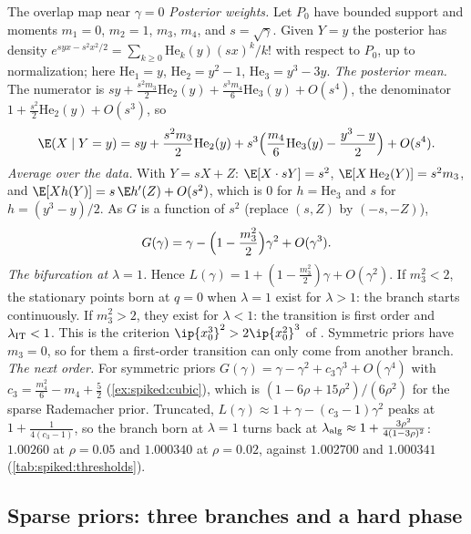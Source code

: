 \begin{refsection}
\begin{computation}{The overlap map near $\gamma=0$}\label{comp:spiked:expansion}
\step \emph{Posterior weights.} Let $P_0$ have bounded support and moments $m_1=0$, $m_2=1$, $m_3$, $m_4$, and $s=\sqrt\gamma$. Given $Y=y$ the posterior has density $e^{syx-s^2x^2/2}=\sum_{k\ge0}\mathrm{He}_k(y)(sx)^k/k!$ with respect to $P_0$, up to normalization; here $\mathrm{He}_1=y$, $\mathrm{He}_2=y^2-1$, $\mathrm{He}_3=y^3-3y$.
\step \emph{The posterior mean.} The numerator is $sy+\frac{s^2m_3}2\mathrm{He}_2(y)+\frac{s^3m_4}6\mathrm{He}_3(y)+O(s^4)$, the denominator $1+\frac{s^2}2\mathrm{He}_2(y)+O(s^3)$, so
\[
\E(X\mid Y=y)=sy+\frac{s^2m_3}2\mathrm{He}_2(y)+s^3\Bigl(\frac{m_4}6\mathrm{He}_3(y)-\frac{y^3-y}2\Bigr)+O(s^4).
\]
\step \emph{Average over the data.} With $Y=sX+Z$: $\E[X\cdot sY]=s^2$, $\E[X\,\mathrm{He}_2(Y)]=s^2m_3$, and $\E[Xh(Y)]=s\,\E h'(Z)+O(s^2)$, which is $0$ for $h=\mathrm{He}_3$ and $s$ for $h=(y^3-y)/2$. As $G$ is a function of $s^2$ (replace $(s,Z)$ by $(-s,-Z)$),
\[
G(\gamma)=\gamma-\Bigl(1-\frac{m_3^2}2\Bigr)\gamma^2+O(\gamma^3).
\]
\step \emph{The bifurcation at $\lambda=1$.} Hence $L(\gamma)=1+(1-\frac{m_3^2}2)\gamma+O(\gamma^2)$. If $m_3^2<2$, the stationary points born at $q=0$ when $\lambda=1$ exist for $\lambda>1$: the branch starts continuously. If $m_3^2>2$, they exist for $\lambda<1$: the transition is first order and $\lambda_{\mathrm{IT}}<1$. This is the criterion $\ip{x_0^3}^2>2\ip{x_0^2}^3$ of \textcite{LesieurKrzakalaZdeborova2017}. Symmetric priors have $m_3=0$, so for them a first-order transition can only come from another branch.
\step \emph{The next order.} For symmetric priors $G(\gamma)=\gamma-\gamma^2+c_3\gamma^3+O(\gamma^4)$ with $c_3=\frac{m_4^2}6-m_4+\frac52$ (\cref{ex:spiked:cubic}), which is $(1-6\rho+15\rho^2)/(6\rho^2)$ for the sparse Rademacher prior. Truncated, $L(\gamma)\approx1+\gamma-(c_3-1)\gamma^2$ peaks at $1+\frac1{4(c_3-1)}$, so the branch born at $\lambda=1$ turns back at $\lambda_{\mathrm{alg}}\approx1+\frac{3\rho^2}{4(1-3\rho)^2}$: $1.00260$ at $\rho=0.05$ and $1.000340$ at $\rho=0.02$, against $1.002700$ and $1.000341$ (\cref{tab:spiked:thresholds}).
\end{computation}

\subsection{Sparse priors: three branches and a hard phase}\label{sec:spiked:sparse}


\end{refsection}
